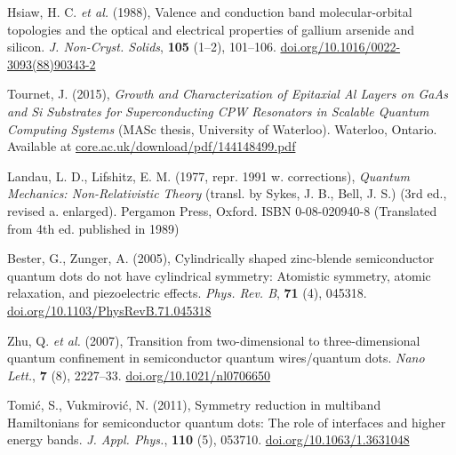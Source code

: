 \documentclass[12pt]{report}
\begin{document}
\begin{thebibliography}{10}
Hsiaw, H. C. \textit{et al.} (1988), Valence and conduction band molecular-orbital topologies and the optical and electrical properties of gallium arsenide and silicon. \textit{J. Non-Cryst. Solids}, \textbf{105} (1--2), 101--106. \href{https://doi.org/10.1016/0022-3093(88)90343-2}{doi.org/10.1016/0022-3093(88)90343-2}

Tournet, J. (2015), \textit{Growth and Characterization of Epitaxial Al Layers on GaAs and Si Substrates for Superconducting CPW Resonators in Scalable Quantum Computing Systems} (MASc thesis, University of Waterloo). Waterloo, Ontario. Available at \href{https://core.ac.uk/download/pdf/144148499.pdf}{core.ac.uk/download/pdf/144148499.pdf}

Landau, L. D., Lifshitz, E. M. (1977, repr. 1991 w. corrections), \textit{Quantum Mechanics: Non-Relativistic Theory} (transl. by Sykes, J. B., Bell, J. S.) (3rd ed., revised a. enlarged). Pergamon Press, Oxford. ISBN 0-08-020940-8 (Translated from 4th ed. published in 1989)

Bester, G., Zunger, A. (2005), Cylindrically shaped zinc-blende semiconductor quantum dots do not have cylindrical symmetry: Atomistic symmetry, atomic relaxation, and piezoelectric effects. \textit{Phys. Rev. B}, \textbf{71} (4), 045318. \href{https://doi.org/10.1103/PhysRevB.71.045318}{doi.org/10.1103/PhysRevB.71.045318}

Zhu, Q. \textit{et al.} (2007), Transition from two-dimensional to three-dimensional quantum confinement in semiconductor quantum wires/quantum dots. \textit{Nano Lett.}, \textbf{7} (8), 2227--33. \href{https://doi.org/10.1021/nl0706650}{doi.org/10.1021/nl0706650}

Tomić, S., Vukmirović, N. (2011), Symmetry reduction in multiband Hamiltonians for semiconductor quantum dots: The role of interfaces and higher energy bands. \textit{J. Appl. Phys.}, \textbf{110} (5), 053710. \href{https://doi.org/10.1063/1.3631048}{doi.org/10.1063/1.3631048}


\end{thebibliography}



%

\endgroup





\end{document}
